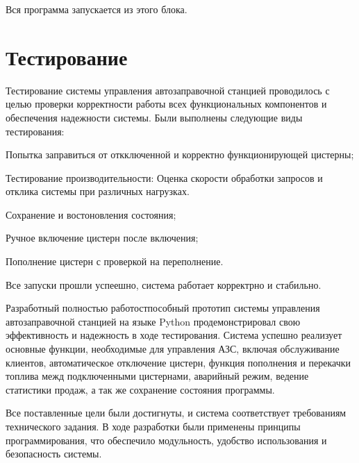 \documentclass{vvsu}
\begin{document}
  Вся программа запускается из этого блока.


\section{Тестирование}
\label{sec:execution}
  Тестирование системы управления автозаправочной станцией проводилось с целью проверки корректности работы всех функциональных компонентов и обеспечения надежности системы. Были выполнены следующие виды тестирования:
\begin{vvsu_itemize}
  \item Попытка заправиться от откключенной и корректно функционирующей цистерны;
  \item Тестирование производительности: Оценка скорости обработки запросов и отклика системы при различных нагрузках.
  \item Сохранение и востоновления состояния;
  \item Ручное включение цистерн после включения;
  \item Пополнение цистерн с проверкой на переполнение.
\end{vvsu_itemize}

  Все запуски прошли успеешно, система работает корректрно и стабильно.


\clearpage
\begin{conclusion}
\label{sec:execution}
  Разработный полностью работостпособный прототип системы управления автозаправочной станцией на языке Python продемонстрировал свою эффективность и надежность в ходе тестирования.
  Система успешно реализует основные функции, необходимые для управления АЗС, включая обслуживание клиентов, автоматическое отключение цистерн, функция пополнения и перекачки топлива межд подключенными цистернами, аварийный режим, ведение статистики продаж, а так же сохранение состояния программы.

  Все поставленные цели были достигнуты, и система соответствует требованиям технического задания. В ходе разработки были применены принципы программирования, что обеспечило модульность, удобство использования и безопасность системы.
\end{conclusion}
\end{document}
